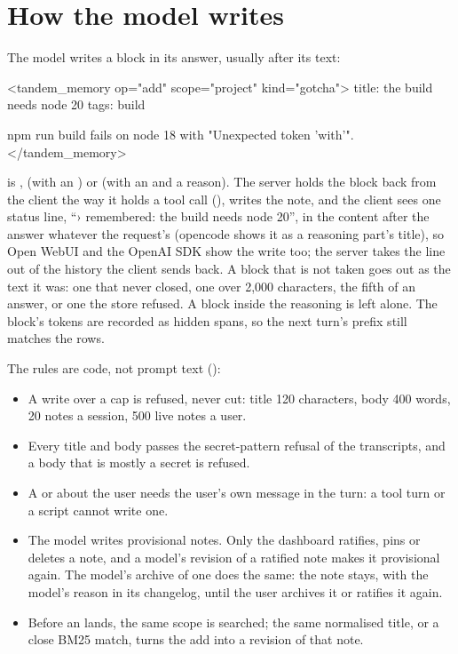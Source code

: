 \section{How the model writes}

The model writes a block in its answer, usually after its text:

\begin{plain}
<tandem_memory op="add" scope="project" kind="gotcha">
title: the build needs node 20
tags: build

npm run build fails on node 18 with "Unexpected token 'with'".
</tandem_memory>
\end{plain}

 is ,  (with an ) or  (with an  and a reason). The server holds the block back from the client the way it holds a tool call (), writes the note, and the client sees one status line, \enquote{› remembered: the build needs node 20}, in the content after the answer whatever the request's  (opencode shows it as a reasoning part's title), so Open WebUI and the OpenAI SDK show the write too; the server takes the line out of the history the client sends back. A block that is not taken goes out as the text it was: one that never closed, one over 2,000 characters, the fifth of an answer, or one the store refused. A block inside the reasoning is left alone. The block's tokens are recorded as hidden spans, so the next turn's prefix still matches the rows.

The rules are code, not prompt text ():

\begin{itemize}
\item A write over a cap is refused, never cut: title 120 characters, body 400 words, 20 notes a session, 500 live notes a user.
\item Every title and body passes the secret-pattern refusal of the transcripts, and a body that is mostly a secret is refused.
\item A  or  about the user needs the user's own message in the turn: a tool turn or a script cannot write one.
\item The model writes provisional notes. Only the dashboard ratifies, pins or deletes a note, and a model's revision of a ratified note makes it provisional again. The model's archive of one does the same: the note stays, with the model's reason in its changelog, until the user archives it or ratifies it again.
\item Before an  lands, the same scope is searched; the same normalised title, or a close BM25 match, turns the add into a revision of that note.
\end{itemize}

